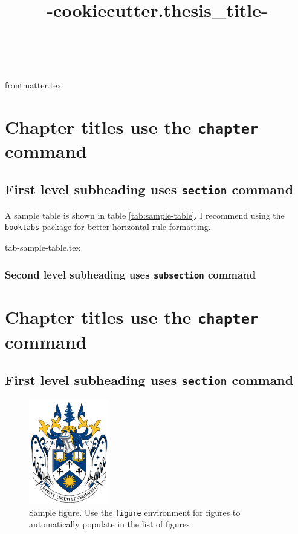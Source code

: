 \documentclass[openany, 12pt]{book}
\title{ {{-cookiecutter.thesis_title-}} }
\author{\givenname\ \surname}
\begin{document}
{frontmatter.tex}

\chapter{Chapter titles use the \texttt{chapter} command}

\section{First level subheading uses \texttt{section} command}

A sample table is shown in table \ref{tab:sample-table}.
I recommend using the \texttt{booktabs} package for better horizontal rule formatting.

\begin{table}
    \centering
    \caption{Sample table which will automatically update in List of Tables}
    \label{tab:sample-table}
    {tab-sample-table.tex}
\end{table}

\subsection{Second level subheading uses \texttt{subsection} command}

\chapter{Chapter titles use the \texttt{chapter} command}

\section{First level subheading uses \texttt{section} command}

\begin{figure}
    \centering
    \includegraphics[width=3.5cm]{laurentian-university-coa.png}
    \caption{Sample figure. Use the \texttt{figure} environment for figures to automatically populate in the list of figures}
\end{figure}
\end{document}
